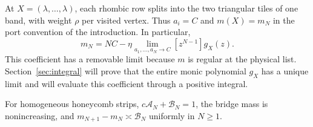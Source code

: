 At $X=(\lambda,\ldots,\lambda)$, each rhombic row splits into the
two triangular tiles of one band, with weight $\rho$ per visited
vertex. Thus $a_i=C$ and $m(X)=m_N$ in the port convention of the
introduction. In particular,
\begin{equation}\label{eq:physical-arch-coefficient}
 m_N=NC-\eta\lim_{a_1,\ldots,a_N\to C}
                [z^{N-1}]g_X(z).
\end{equation}
This coefficient has a removable limit because $m$ is regular at the
physical list. Section~\ref{sec:integral} will prove that the entire
monic polynomial $g_X$ has a unique limit and will evaluate this
coefficient through a positive integral.

\begin{lemma}\label{lem:moment-increments}
For homogeneous honeycomb strips,
$c\mathcal A_N+\mathcal B_N=1$, the bridge mass is nonincreasing,
and $m_{N+1}-m_N\asymp\mathcal B_N$ uniformly in $N\ge1$.
\end{lemma}

